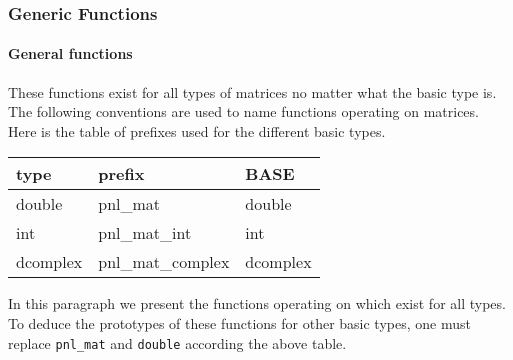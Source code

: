 \subsubsection{Generic Functions}
\paragraph{General functions}
These functions exist for all types of matrices no matter what the basic type
is. The following conventions are used to name functions operating on matrices.
Here is the table of prefixes used for the different basic types.

\begin{center}
  \begin{tabular}[t]{lll}
    type & prefix & BASE\\
    \hline
    double & pnl_mat & double \\
    \hline
    int & pnl_mat_int & int \\
    \hline
    dcomplex & pnl_mat_complex & dcomplex
  \end{tabular}
\end{center}

In this paragraph we present the functions operating on 
which exist for all types. To deduce the prototypes of these functions for
other basic types, one must replace {\tt pnl_mat} and {\tt double} according
the above table.

